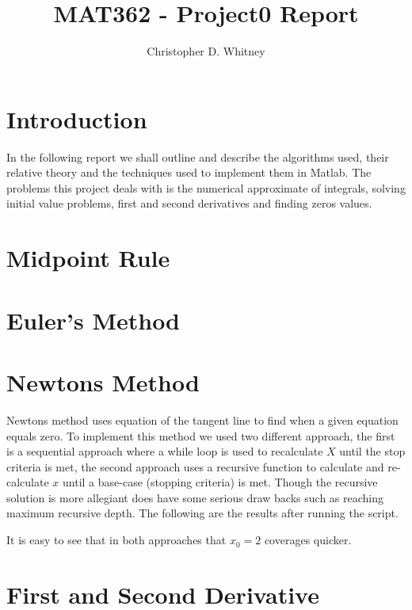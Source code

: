 \documentclass{article}
\begin{document}
\title{MAT362 - Project0 Report}
\author{Christopher D. Whitney}

\maketitle

\section{Introduction}

In the following report we shall outline and describe the algorithms used, their relative theory and the techniques used to implement them in Matlab. The problems this project deals with is the numerical approximate of integrals, solving initial value problems, first and second derivatives and finding zeros values. 

\section{Midpoint Rule}

\section{Euler's Method}

\section{Newtons Method}
Newtons method uses equation of the tangent line to find when a given equation equals zero. To implement this method we used two different approach, the first is a sequential approach where a while loop is used to recalculate $X$ until the stop criteria is met, the second approach uses a recursive function to calculate and re-calculate $x$ until a base-case (stopping criteria) is met. Though the recursive solution is more allegiant does have some serious draw backs such as reaching maximum recursive depth. The following are the results after running the script. 



It is easy to see that in both approaches that $x_0 = 2$ coverages quicker. 

\section{First and Second Derivative}
\end{document}
